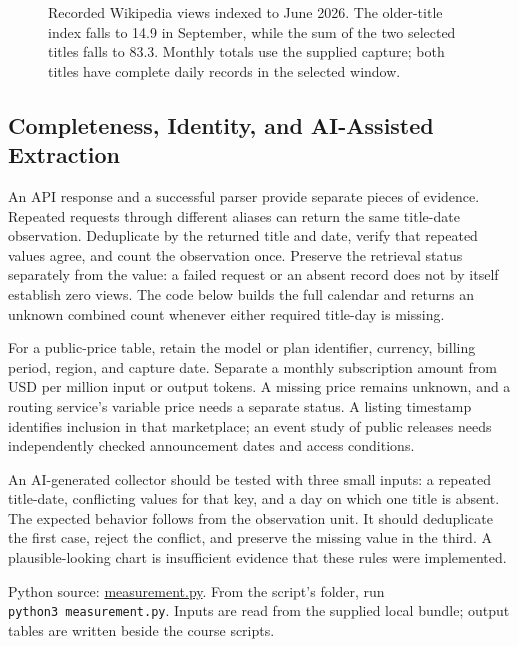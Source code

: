 \begin{figure}[htbp]
\centering

\caption{Recorded Wikipedia views indexed to June 2026. The older-title index falls to 14.9 in September, while the sum of the two selected titles falls to 83.3. Monthly totals use the supplied capture; both titles have complete daily records in the selected window.}\label{fig:M02_genai_titles}
\end{figure}

\hypertarget{M02-completeness-identity-and-ai-assisted-extraction}{%
\subsection{Completeness, Identity, and AI-Assisted
Extraction}\label{M02-completeness-identity-and-ai-assisted-extraction}}

\noindent An API response and a successful parser provide separate pieces of
evidence. Repeated requests through different aliases can return the
same title-date observation. Deduplicate by the returned title and date,
verify that repeated values agree, and count the observation once.
Preserve the retrieval status separately from the value: a failed
request or an absent record does not by itself establish zero views. The
code below builds the full calendar and returns an unknown combined
count whenever either required title-day is missing.

For a public-price table, retain the model or plan identifier, currency,
billing period, region, and capture date. Separate a monthly
subscription amount from USD per million input or output tokens. A
missing price remains unknown, and a routing service's variable price
needs a separate status. A listing timestamp identifies inclusion in
that marketplace; an event study of public releases needs independently
checked announcement dates and access conditions.

An AI-generated collector should be tested with three small inputs: a
repeated title-date, conflicting values for that key, and a day on which
one title is absent. The expected behavior follows from the observation
unit. It should deduplicate the first case, reject the conflict, and
preserve the missing value in the third. A plausible-looking chart is
insufficient evidence that these rules were implemented.

\FloatBarrier
{}
Python source:
\href{../03_Data_and_Code/GenAI_Demand/measurement.py}{measurement.py}.
From the script's folder, run \texttt{python3\ measurement.py}. Inputs
are read from the supplied local bundle; output tables are written
beside the course scripts.


